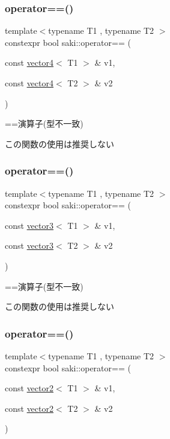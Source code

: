\subsubsection{\texorpdfstring{operator==()}{operator==()}\hspace{0.1cm}{\footnotesize\ttfamily [7/11]}}
{\footnotesize\ttfamily template$<$typename T1 , typename T2 $>$ \\
constexpr bool saki\+::operator== (\begin{DoxyParamCaption}\item[{const \mbox{\hyperlink{classsaki_1_1vector4}{vector4}}$<$ T1 $>$ \&}]{v1,  }\item[{const \mbox{\hyperlink{classsaki_1_1vector4}{vector4}}$<$ T2 $>$ \&}]{v2 }\end{DoxyParamCaption})}



==演算子(型不一致) 

この関数の使用は推奨しない \mbox{\label{namespacesaki_a5f3eb3ebd6a3ee43771849069101153f}} 
\subsubsection{\texorpdfstring{operator==()}{operator==()}\hspace{0.1cm}{\footnotesize\ttfamily [8/11]}}
{\footnotesize\ttfamily template$<$typename T1 , typename T2 $>$ \\
constexpr bool saki\+::operator== (\begin{DoxyParamCaption}\item[{const \mbox{\hyperlink{classsaki_1_1vector3}{vector3}}$<$ T1 $>$ \&}]{v1,  }\item[{const \mbox{\hyperlink{classsaki_1_1vector3}{vector3}}$<$ T2 $>$ \&}]{v2 }\end{DoxyParamCaption})}



==演算子(型不一致) 

この関数の使用は推奨しない \mbox{\label{namespacesaki_a07efea0cf7385fc13c00519e8f0f7732}} 
\subsubsection{\texorpdfstring{operator==()}{operator==()}\hspace{0.1cm}{\footnotesize\ttfamily [9/11]}}
{\footnotesize\ttfamily template$<$typename T1 , typename T2 $>$ \\
constexpr bool saki\+::operator== (\begin{DoxyParamCaption}\item[{const \mbox{\hyperlink{classsaki_1_1vector2}{vector2}}$<$ T1 $>$ \&}]{v1,  }\item[{const \mbox{\hyperlink{classsaki_1_1vector2}{vector2}}$<$ T2 $>$ \&}]{v2 }\end{DoxyParamCaption})}



